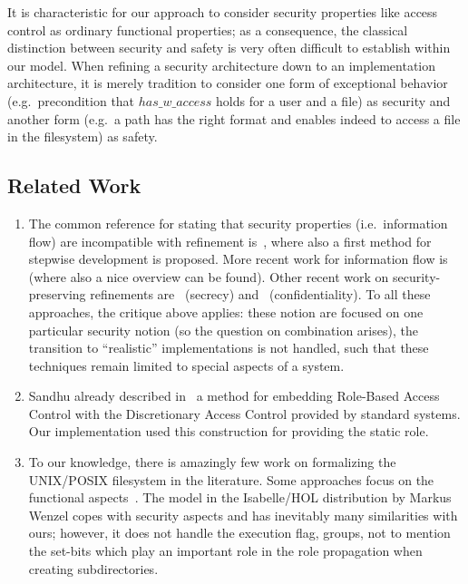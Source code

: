 It is characteristic for our approach to consider security properties like
access control as ordinary functional properties; as a consequence, the
classical distinction between security and safety is very often difficult to
establish within our model. When refining a security architecture down
to an
implementation architecture, it is merely tradition to consider one form of
exceptional behavior (e.g.\ precondition that $has\_w\_access$ holds for a user
and a file) as security and another form (e.g.\ a path has the right format and
enables indeed to access a file in the filesystem) as safety.

\subsection{Related Work}

\begin{enumerate}
\item The common reference for stating that security properties (i.e.\ 
  information flow) are incompatible with refinement
  is~\cite{jacobs:derivation:1998}, where also a first method for stepwise
  development is proposed. More recent work for information flow
  is~\cite{Mantel:inp:2001} (where also a nice overview can be found). Other
  recent work on security-preserving refinements
  are~\cite{juerjens:secrecy-preserving:2001} (secrecy)
  and~\cite{santen:confidentiality-preserving:2002} (confidentiality).  To all
  these approaches, the critique above applies: these notion are focused on one
  particular security notion (so the question on combination arises), the
  transition to ``realistic'' implementations is not handled, such that these
  techniques remain limited to special aspects of a system.
\item Sandhu already described in~\cite{sandhu.ea:decentralized:1998} a method
  for embedding Role-Based Access Control with the Discretionary Access Control
  provided by standard \unix{} systems. Our implementation used this
  construction for providing the static role.
\item To our knowledge, there is amazingly few work on formalizing
  the UNIX/POSIX filesystem in the literature. Some approaches focus
  on the functional
  aspects~\cite{heisel:specification:1995,morgan.ea:unix-filesystem:1984}.
  The model in the Isabelle/HOL distribution by Markus Wenzel copes
  with security aspects and has inevitably many similarities with ours;
  however, it does not handle the execution flag, groups, not to
  mention the set-bits which play an important role in the role
  propagation when creating subdirectories.
 \end{enumerate}
